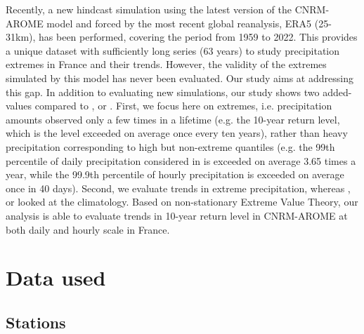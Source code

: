 \documentclass[hess, manuscript]{copernicus}
\begin{document}
Recently, a new hindcast simulation using the latest version of the CNRM-AROME model and forced by the most recent global reanalysis, ERA5 (25-31km), has been performed, covering the period from 1959 to 2022. This provides a unique dataset with sufficiently long series (63 years) to study precipitation extremes in France and their trends. However, the validity of the extremes simulated by this model has never been evaluated. Our study
aims at addressing this gap. 
 In addition to evaluating new simulations, our study shows two added-values compared to \cite{Caillaud2021}, \cite{ban-etal-2021} or \cite{pichelli-etal-2021}. First, we focus here on extremes, i.e. precipitation amounts observed only a few times in a lifetime (e.g. the 10-year return level, which is the level exceeded on average once every ten years), rather than heavy precipitation corresponding to high but non-extreme quantiles (e.g. the 99th percentile of daily precipitation considered in \cite{ban-etal-2021} is exceeded on average 3.65 times a year, while the 99.9th percentile of hourly precipitation is exceeded on average once in 40 days). Second, we evaluate trends in extreme precipitation, whereas \cite{Caillaud2021}, \cite{ban-etal-2021} or \cite{pichelli-etal-2021}  looked at the climatology. Based on non-stationary Extreme Value Theory, our analysis is able to evaluate trends in 10-year return level in CNRM-AROME at both daily and hourly scale in France.


\section{Data used}\label{data-used}

\subsection{Stations}\label{stations}
\end{document}
